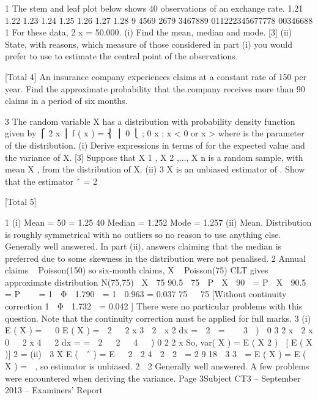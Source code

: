 1
The stem and leaf plot below shows 40 observations of an exchange rate.
1.21
1.22
1.23
1.24
1.25
1.26
1.27
1.28
9
4569
2679
3467889
011222345677778
00346688
1
For these data,
2
\sum  x = 50.000.
(i) Find the mean, median and mode.
[3]
(ii) State, with reasons, which measure of those considered in part (i) you would
prefer to use to estimate the central point of the observations.

[Total 4]
An insurance company experiences claims at a constant rate of 150 per year.
Find the approximate probability that the company receives more than 90 claims in a
period of six months.

3
The random variable X has a distribution with probability density function given by
⎧ 2 x
⎪
f ( x ) = ⎨ 
⎪ 0
⎩
; 0 \leq  x \leq \theta
; x < 0 or x > \theta
where \theta is the parameter of the distribution.
(i)
Derive expressions in terms of \theta for the expected value and the variance of X.
[3]
Suppose that X 1 , X 2 ,..., X n is a random sample, with mean X , from the distribution
of X.
(ii)
3 X
is an unbiased estimator of \theta.
Show that the estimator \theta ˆ =
2

[Total 5]


1
(i)
Mean  =  50
 =  1.25
40
Median = 1.252
Mode = 1.257
(ii)
Mean. Distribution is roughly symmetrical with no outliers so no reason to use
anything else.
Generally well answered. In part (ii), answers claiming that the median is preferred due to
some skewness in the distribution were not penalised.
2
Annual claims ~ Poisson(150) so six-month claims, X ~ Poisson(75)
CLT gives approximate distribution N(75,75)
 X  75 90.5  75 
P  X  90   =  P  X  90.5   =  P 

  =  1  Φ  1.790   =  1  0.963  =  0.037
75 
 75
[Without continuity correction 1  Φ  1.732   =  0.042 ]
There were no particular problems with this question. Note that the continuity correction
must be applied for full marks.
3
(i)
E ( X )  =  

0
E ( X )  =  
2

 2 x 3 
2 
x 2 dx  =   2   = 

  3  )  0 3
2 x
 2
x
0

 2 x 4 
 2
dx
 = 
 = 
 2 
 2
  4   ) 0 2
2 x
So, var( X )  =  E ( X 2 )  [ E ( X )] 2  = 
(ii)
 3 X
E (  ˆ )  =  E 
 2
 2 4  2  2

 = 
2
9
18
 3
3
  =  E ( X )  =  E ( X )  =   , so estimator is unbiased.
2
 2
Generally well answered. A few problems were encountered when deriving the variance.
Page 3Subject CT3 – September 2013 – Examiners’ Report


